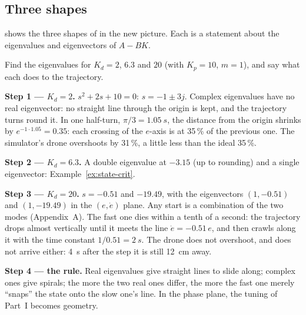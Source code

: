 
\subsection{Three shapes}
 shows the three shapes of  in the new picture. Each is a statement about the eigenvalues and eigenvectors of $A - BK$.

\begin{example}
\label{ex:state-shapes}
Find the eigenvalues for $K_d = 2$, $6.3$ and $20$ (with $K_p = 10$, $m = 1$), and say what each does to the trajectory.

\textbf{Step 1 — $K_d = 2$.} $s^2 + 2s + 10 = 0$: $s = -1 \pm 3j$. Complex eigenvalues have no real eigenvector: no straight line through the origin is kept, and the trajectory turns round it. In one half-turn, $\pi/3 = \SI{1.05}{s}$, the distance from the origin shrinks by $e^{-1 \cdot 1.05} = 0.35$: each crossing of the $e$-axis is at 35\,\% of the previous one. The simulator's drone overshoots by 31\,\%, a little less than the ideal 35\,\%.

\textbf{Step 2 — $K_d = 6.3$.} A double eigenvalue at $-3.15$ (up to rounding) and a single eigenvector: Example~\ref{ex:state-crit}.

\textbf{Step 3 — $K_d = 20$.} $s = -0.51$ and $-19.49$, with the eigenvectors $(1, -0.51)$ and $(1, -19.49)$ in the $(e, \dot e)$ plane. Any start is a combination of the two modes (Appendix~A). The fast one dies within a tenth of a second: the trajectory drops almost vertically until it meets the line $\dot e = -0.51\,e$, and then crawls along it with the time constant $1/0.51 = \SI{2}{s}$. The drone does not overshoot, and does not arrive either: \SI{4}{s} after the step it is still \SI{12}{cm} away.

\textbf{Step 4 — the rule.} Real eigenvalues give straight lines to slide along; complex ones give spirals; the more the two real ones differ, the more the fast one merely \enquote{snaps} the state onto the slow one's line. In the phase plane, the tuning of Part~I becomes geometry.
\end{example}

